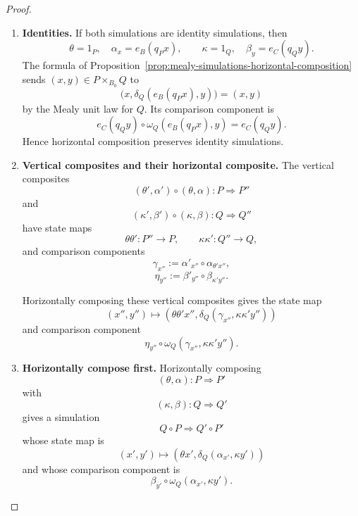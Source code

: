 \begin{proof}
    \leavevmode
    \begin{enumerate}
        \item \textbf{Identities.}
        If both simulations are identity simulations, then
        \[
            \theta=1_P,
            \quad
            \alpha_x=e_B(q_Px),
            \qquad
            \kappa=1_Q,
            \quad
            \beta_y=e_C(q_Qy).
        \]
        The formula of
        Proposition~\ref{prop:mealy-simulations-horizontal-composition}
        sends \((x,y)\in P\times_{B_0}Q\) to
        \[
            \bigl(x,\delta_Q(e_B(q_Px),y)\bigr)
            =
            (x,y)
        \]
        by the Mealy unit law for \(Q\). Its comparison component is
        \[
            e_C(q_Qy)\circ
            \omega_Q(e_B(q_Px),y)
            =
            e_C(q_Qy).
        \]
        Hence horizontal composition preserves identity simulations.

        \item \textbf{Vertical composites and their horizontal composite.}
        The vertical composites
        \[
            (\theta',\alpha')\circ(\theta,\alpha):
            P\Rightarrow P''
        \]
        and
        \[
            (\kappa',\beta')\circ(\kappa,\beta):
            Q\Rightarrow Q''
        \]
        have state maps
        \[
            \theta\theta':P''\to P,
            \qquad
            \kappa\kappa':Q''\to Q,
        \]
        and comparison components
        \[
            \gamma_{x''}
            :=
            \alpha'_{x''}\circ
            \alpha_{\theta'x''},
        \]
        \[
            \eta_{y''}
            :=
            \beta'_{y''}\circ
            \beta_{\kappa'y''}.
        \]

        Horizontally composing these vertical composites gives the state map
        \[
            (x'',y'')
            \longmapsto
            \left(
                \theta\theta'x'',
                \delta_Q(\gamma_{x''},\kappa\kappa'y'')
            \right)
        \]
        and comparison component
        \[
            \eta_{y''}\circ
            \omega_Q(\gamma_{x''},\kappa\kappa'y'').
        \]

        \item \textbf{Horizontally compose first.}
        Horizontally composing
        \[
            (\theta,\alpha):P\Rightarrow P'
        \]
        with
        \[
            (\kappa,\beta):Q\Rightarrow Q'
        \]
        gives a simulation
        \[
            Q\circ P\Rightarrow Q'\circ P'
        \]
        whose state map is
        \[
            (x',y')
            \longmapsto
            \left(
                \theta x',
                \delta_Q(\alpha_{x'},\kappa y')
            \right)
        \]
        and whose comparison component is
        \[
            \beta_{y'}\circ
            \omega_Q(\alpha_{x'},\kappa y').
        \]


\end{enumerate}
\end{proof}
